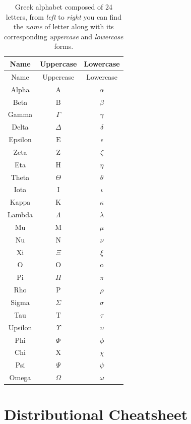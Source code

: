 \documentclass[
  letterpaper,
  DIV=11,
  numbers=noendperiod]{scrreprt}
\begin{document}
\begin{longtable}[]{@{}ccc@{}}
\caption{Greek alphabet composed of 24 letters, from \emph{left} to
\emph{right} you can find the \emph{name} of letter along with its
corresponding \emph{uppercase} and \emph{lowercase}
forms.}\label{tbl-greek-alphabet}\tabularnewline
\toprule\noalign{}
Name & Uppercase & Lowercase \\
\midrule\noalign{}
\endfirsthead
\toprule\noalign{}
Name & Uppercase & Lowercase \\
\midrule\noalign{}
\endhead
\bottomrule\noalign{}
\endlastfoot
Alpha & \(\text{A}\) & \(\alpha\) \\
Beta & \(\text{B}\) & \(\beta\) \\
Gamma & \(\Gamma\) & \(\gamma\) \\
Delta & \(\Delta\) & \(\delta\) \\
Epsilon & \(\text{E}\) & \(\epsilon\) \\
Zeta & \(\text{Z}\) & \(\zeta\) \\
Eta & \(\text{H}\) & \(\eta\) \\
Theta & \(\Theta\) & \(\theta\) \\
Iota & \(\text{I}\) & \(\iota\) \\
Kappa & \(\text{K}\) & \(\kappa\) \\
Lambda & \(\Lambda\) & \(\lambda\) \\
Mu & \(\text{M}\) & \(\mu\) \\
Nu & \(\text{N}\) & \(\nu\) \\
Xi & \(\Xi\) & \(\xi\) \\
O & \(\text{O}\) & \(\text{o}\) \\
Pi & \(\Pi\) & \(\pi\) \\
Rho & \(\text{P}\) & \(\rho\) \\
Sigma & \(\Sigma\) & \(\sigma\) \\
Tau & \(\text{T}\) & \(\tau\) \\
Upsilon & \(\Upsilon\) & \(\upsilon\) \\
Phi & \(\Phi\) & \(\phi\) \\
Chi & \(\text{X}\) & \(\chi\) \\
Psi & \(\Psi\) & \(\psi\) \\
Omega & \(\Omega\) & \(\omega\) \\
\end{longtable}

\chapter{Distributional Cheatsheet}\label{sec-distributional-cheatsheet}
\end{document}
